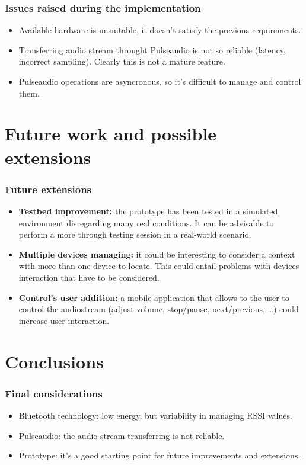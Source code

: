 \documentclass{beamer}
\begin{document}
\begin{frame}
\frametitle{Issues raised during the implementation}
\begin{itemize}
	\pause
	\item Available hardware is unsuitable, it doesn't satisfy the previous requirements.
	\pause
	\item Transferring audio stream throught Pulseaudio is not so reliable (latency, incorrect sampling). Clearly this is not a mature feature.
	\pause
	\item Pulseaudio operations are asyncronous, so it's difficult to manage and control them.
\end{itemize}
\end{frame}


\section{Future work and possible extensions}

\begin{frame}
\frametitle{Future extensions}
\begin{itemize}
	\item \textbf{Testbed improvement:} the prototype has been tested in a simulated environment disregarding many real conditions. It can be advisable to perform a more through testing session in a real-world scenario.
	\pause
	\item \textbf{Multiple devices managing:} it could be interesting to consider a context with more than one device to locate. This could entail problems with devices interaction that have to be considered.
	\pause
	\item \textbf{Control's user addition:} a mobile application that allows to the user to control the audiostream (adjust volume, stop/pause, next/previous, \ldots) could increase user interaction.
\end{itemize}
\end{frame}


\section{Conclusions}

\begin{frame}
\frametitle{Final considerations}
\begin{itemize}
	\item Bluetooth technology: low energy, but variability in managing RSSI values.
	\pause
	\item Pulseaudio: the audio stream transferring is not reliable.
	\pause
	\item Prototype: it's a good starting point for future improvements and extensions.
\end{itemize}
\end{frame}
\end{document}
